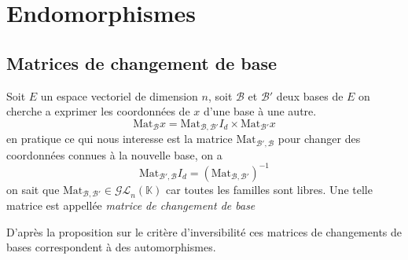\documentclass[11pt,colorlinks]{book}
\theoremstyle{mytheoremstyle}
\theoremstyle{mytheoremstyle}
\theoremstyle{mytheoremstyle}
\theoremstyle{mytheoremstyle}
\theoremstyle{mytheoremstyle}
\theoremstyle{mytheoremstyle}
\theoremstyle{mytheoremstyle}
\theoremstyle{mytheoremstyle}
\theoremstyle{myproblemstyle}
\def\mbb#1{\mathbb{#1}}
\def\mfc#1{\mathcal{#1}}
\def\bK{\mbb{K}}
\def\ev{espace vectoriel }
\begin{document}
\section{Endomorphismes}
\subsection{Matrices de changement de base}
\begin{definition}
  Soit $E$ un \ev de dimension $n$, soit $\mfc{B}$ et $\mfc{B}'$ deux bases de $E$ on cherche a exprimer les coordonnées de $x$ d'une base 
  à une autre. 
  \begin{equation*}
    \text{Mat}_{\mfc{B}} x = \text{Mat}_{\mfc{B},\mfc{B}'} I_d \times \text{Mat}_{\mfc{B}'} x
  \end{equation*}
  en pratique ce qui nous interesse est la matrice $\text{Mat}_{\mfc{B}',\mfc{B}}$ pour changer des coordonnées connues à la nouvelle base, on a 
  \begin{equation*}
    \text{Mat}_{\mfc{B}',\mfc{B}} I_d = \left(\text{Mat}_{\mfc{B},\mfc{B}'}\right)^{-1}
  \end{equation*}
  on sait que $\text{Mat}_{\mfc{B},\mfc{B}'} \in \mfc{GL}_n(\bK)$ car toutes les familles sont libres. 
  Une telle matrice est appellée \textit{matrice de changement de base}
\end{definition}
\begin{rmq}
  D'après la proposition sur le critère d'inversibilité ces matrices de changements de bases correspondent à des automorphismes.
\end{rmq}
\end{document}
